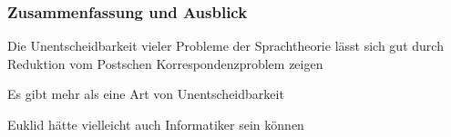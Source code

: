 \documentclass[onlymath]{beamer}
\begin{document}
\begin{frame}\frametitle{Zusammenfassung und Ausblick}

Die Unentscheidbarkeit vieler Probleme der Sprachtheorie lässt sich gut durch Reduktion vom Postschen Korrespondenzproblem zeigen\bigskip

Es gibt mehr als eine Art von Unentscheidbarkeit\bigskip

Euklid hätte vielleicht auch Informatiker sein können\bigskip


\end{frame}

% 
% 
% 
% 
% 
% 
\end{document}
